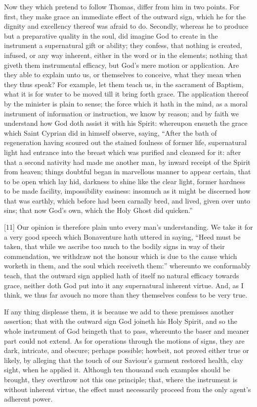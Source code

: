 Now they which pretend to follow Thomas, differ from him in two points. For first, they make grace an immediate effect of the outward sign, which he for the dignity and excellency thereof was afraid to do. Secondly, whereas he to produce but a preparative quality in the soul, did imagine God to create in the instrument a supernatural gift or ability; they confess, that nothing is created, infused, or any way inherent, either in the word or in the elements; nothing that giveth them instrumental efficacy, but God’s mere motion or application. Are they able to explain unto us, or themselves  to conceive, what they mean when they thus speak? For example, let them teach us, in the sacrament of Baptism, what it is for water to be moved till it bring forth grace. The application thereof by the minister is plain to sense; the force which it hath in the mind, as a moral instrument of information or instruction, we know by reason; and by faith we understand how God doth assist it with his Spirit: whereupon ensueth the grace which Saint Cyprian did in himself observe, saying, “After the bath of regeneration having scoured out the stained foulness of former life, supernatural light had entrance into the breast which was purified and cleansed for it: after that a second nativity had made me another man, by inward receipt of the Spirit from heaven; things doubtful began in marvellous manner to appear certain, that to be open which lay hid, darkness to shine like the clear light, former hardness to be made facility, impossibility easiness: insomuch as it might be discerned how that was earthly, which before had been carnally bred, and lived, given over unto sins; that now God’s own, which the Holy Ghost did quicken.”

[11] Our opinion is therefore plain unto every man’s understanding. We take it for a very good speech which Bonaventure hath uttered in saying, “Heed must be taken, that while we ascribe too much to the bodily signs in way of their commendation, we withdraw not the honour which is due to the cause which worketh in them, and the soul which receiveth them:” whereunto we conformably teach, that the outward sign applied hath of itself no natural efficacy towards grace, neither doth God put into it any supernatural  inherent virtue. And, as I think, we thus far avouch no more than they themselves confess to be very true.

If any thing displease them, it is because we add to these premisses another assertion; that with the outward sign God joineth his Holy Spirit, and so the whole instrument of God bringeth that to pass, whereunto the baser and meaner part could not extend. As for operations through the motions of signs, they are dark, intricate, and obscure; perhaps possible; howbeit, not proved either true or likely, by alleging that the touch of our Saviour’s garment restored health, clay sight, when he applied it. Although ten thousand such examples should be brought, they overthrow not this one principle; that, where the instrument is without inherent virtue, the effect must necessarily proceed from the only agent’s adherent power.

